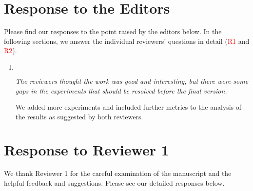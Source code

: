 \documentclass[11pt]{article}
\newenvironment{reviewer}
{\begin{mdframed}[roundcorner = 10pt,fontcolor=blue!70!black]\itshape}
{\end{mdframed}}
\begin{document}
\clearpage

\section*{Response to the Editors}
Please find our responses to the point raised by the editors below. 
In the following sections, we answer the individual reviewers' questions in detail (\textcolor{red}{R1} and \textcolor{red}{R2}).

\begin{enumerate}[I.]
\begin{comment}
 \item $ $
  \begin{reviewer}
  On the basis of the reviewers' ratings and comments, we decided that your paper cannot be published in the Letters in the present form. However, you are encouraged to rewrite and resubmit a revised version of your work addressing all editorial concerns. 
  \end{reviewer}
\end{comment}
\item $ $
  \begin{reviewer}
The reviewers thought the work was good and interesting, but there were some gaps in the experiments that should be resolved before the final version. 
  \end{reviewer}
  \noindent
  We added more experiments and included further metrics to the analysis of the results as suggested by both reviewers. 
\end{enumerate}


 \clearpage

\section*{Response to Reviewer 1}
We thank Reviewer 1 for the careful examination of the manuscript and the helpful feedback and suggestions. Please see our detailed responses below.
\end{document}
